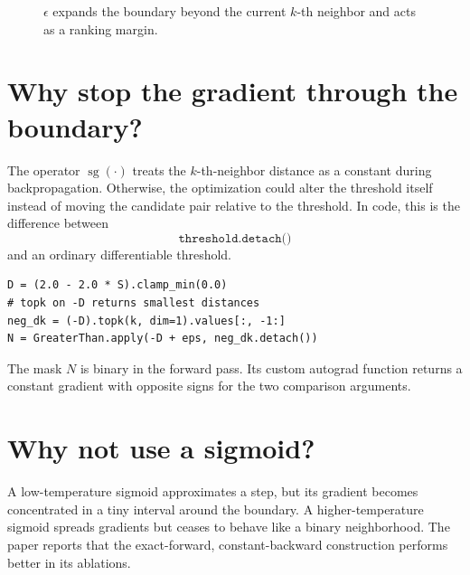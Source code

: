 \documentclass[11pt,oneside,openany]{book}
\theoremstyle{myplain}
\theoremstyle{definition}
\newcommand{\sg}{\operatorname{sg}}
\newcommand{\code}[1]{\texttt{#1}}
\begin{document}
\begin{figure}[H]
\centering
{}
\caption{$\epsilon$ expands the boundary beyond the current $k$-th neighbor and acts as a ranking margin.}
\label{fig:epsilon-neighborhood}
\end{figure}

\section{Why stop the gradient through the boundary?}

The operator $\sg(\cdot)$ treats the $k$-th-neighbor distance as a constant during backpropagation. Otherwise, the optimization could alter the threshold itself instead of moving the candidate pair relative to the threshold. In code, this is the difference between
\[
  \code{threshold.detach()}
\]
and an ordinary differentiable threshold.

\begin{implementationbox}[title=Paper-to-code translation]
\begin{lstlisting}
D = (2.0 - 2.0 * S).clamp_min(0.0)
# topk on -D returns smallest distances
neg_dk = (-D).topk(k, dim=1).values[:, -1:]
N = GreaterThan.apply(-D + eps, neg_dk.detach())
\end{lstlisting}
The mask $N$ is binary in the forward pass. Its custom autograd function returns a constant gradient with opposite signs for the two comparison arguments.
\end{implementationbox}

\section{Why not use a sigmoid?}

A low-temperature sigmoid approximates a step, but its gradient becomes concentrated in a tiny interval around the boundary. A higher-temperature sigmoid spreads gradients but ceases to behave like a binary neighborhood. The paper reports that the exact-forward, constant-backward construction performs better in its ablations.
\end{document}
